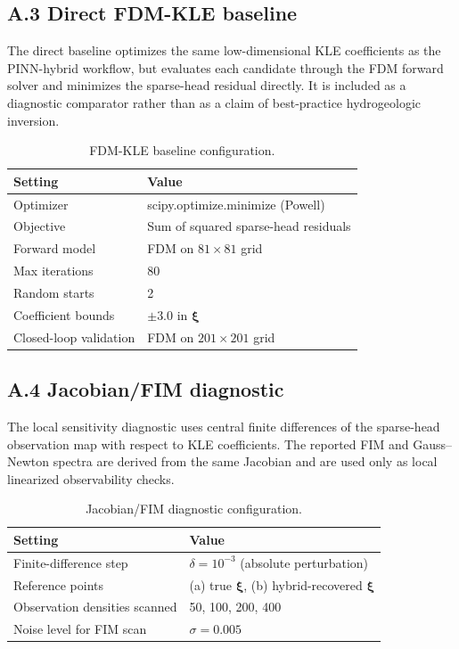 \documentclass[pdflatex,sn-mathphys,Numbered,iicol]{sn-jnl}
\newcommand{\bxi}{\boldsymbol{\xi}}
\begin{document}
\subsection*{A.3 Direct FDM-KLE baseline}

The direct baseline optimizes the same low-dimensional KLE coefficients as the
PINN-hybrid workflow, but evaluates each candidate through the FDM forward
solver and minimizes the sparse-head residual directly. It is included as a
diagnostic comparator rather than as a claim of best-practice hydrogeologic
inversion.

\begin{table}[!ht]
  \caption{FDM-KLE baseline configuration.}
  \label{tab:config-baseline}
  \centering\small
  \setlength{\tabcolsep}{3pt}
  \begin{tabular}{@{}p{}p{}@{}}
    \toprule
    Setting & Value \\
    \midrule
    Optimizer & scipy.optimize.minimize (Powell) \\
    Objective & Sum of squared sparse-head residuals \\
    Forward model & FDM on $81 \times 81$ grid \\
    Max iterations & 80 \\
    Random starts & 2 \\
    Coefficient bounds & $\pm 3.0$ in $\bxi$ \\
    Closed-loop validation & FDM on $201 \times 201$ grid \\
    \bottomrule
  \end{tabular}
\end{table}

\subsection*{A.4 Jacobian/FIM diagnostic}

The local sensitivity diagnostic uses central finite differences of the
sparse-head observation map with respect to KLE coefficients. The reported FIM
and Gauss--Newton spectra are derived from the same Jacobian and are used only
as local linearized observability checks.

\begin{table}[!ht]
  \caption{Jacobian/FIM diagnostic configuration.}
  \label{tab:config-fim}
  \centering\small
  \setlength{\tabcolsep}{3pt}
  \begin{tabular}{@{}p{}p{}@{}}
    \toprule
    Setting & Value \\
    \midrule
    Finite-difference step & $\delta = 10^{-3}$ (absolute perturbation) \\
    Reference points & (a) true $\bxi$, (b) hybrid-recovered $\bxi$ \\
    Observation densities scanned & 50, 100, 200, 400 \\
    Noise level for FIM scan & $\sigma = 0.005$ \\
    \bottomrule
  \end{tabular}
\end{table}
\end{document}
